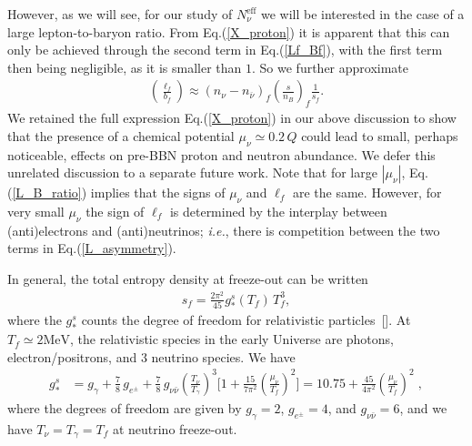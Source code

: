 However, as we will see, for our study of $N_\nu^{\mathrm{eff}}$ we will be interested in the case of a large lepton-to-baryon ratio. From Eq.\;(\ref{X_proton}) it is apparent that this can only be achieved through the second term in Eq.\;(\ref{Lf_Bf}), with the first term then being negligible, as it is smaller than $1$. So we further approximate
\begin{align}\label{L_B_ratio}
\left(\frac{\ell_f}{b_f}\right)  
\approx\left(n_{\nu}-n_{\overline{\nu}}\right)_f \left(\frac{s}{n_B}\right)_f \frac{1}{s_f}.
\end{align}
We retained the full expression Eq.\;(\ref{X_proton}) in our above discussion to show that the presence of a chemical potential $\mu_\nu\simeq 0.2\,Q$ could lead to small, perhaps noticeable, effects on pre-BBN proton and neutron abundance. We defer this unrelated discussion to a separate future work. Note that for large $|\mu_\nu|$, Eq.\;(\ref{L_B_ratio}) implies that the signs of $\mu_\nu$ and $\ell_f$ are the same. However, for very small $\mu_\nu$ the sign of $\ell_f$ is determined by the interplay between (anti)electrons and (anti)neutrinos; {\it i.e.\/}, there is competition between the two terms in Eq.\;(\ref{L_asymmetry}).

In general, the total entropy density at freeze-out can be written
\begin{align}
\label{Entropy_density}
s_f=\frac{2\pi^2}{45}g^s_\ast(T_f)\,T_f^3,
\end{align}
where the $g^s_\ast$ counts the degree of freedom for relativistic particles~[\cite{Kolb:1990vq}]. At $T_f\simeq 2\mathrm{MeV}$, the relativistic species in the early Universe are photons, electron/positrons, and $3$ neutrino species. We have
\begin{align}
g^s_{\ast}&= g_\gamma+\frac{7}{8}\,g_{e^\pm}+\frac{7}{8}\,g_{\nu\bar{\nu}}\left(\frac{T_\nu}{T_\gamma}\right)^{\!\!3}\bigg[1+\frac{15}{7\pi^2}\left(\frac{\mu_\nu}{T_f}\right)^{\!\!2}\bigg]=10.75+\frac{45}{4\pi^2}\left(\frac{\mu_\nu}{T_f}\right)^{\!\!2}\;,
\end{align}
where the degrees of freedom are given by $g_\gamma=2$, $g_{e^\pm}=4$, and $g_{\nu\bar{\nu}}=6$, and we have $T_\nu=T_\gamma=T_f$ at neutrino freeze-out.

